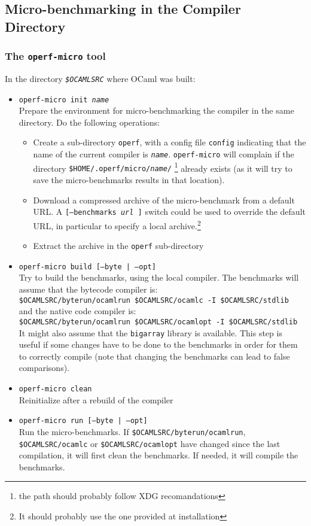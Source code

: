 \documentclass[11pt,a4paper]{article}
\begin{document}
\subsection{Micro-benchmarking in the Compiler Directory}

\subsubsection{The {\tt operf-micro} tool}

In the directory {\tt\em \$OCAMLSRC} where OCaml was built:
\begin{itemize}
\item {\tt operf-micro init {\em name}}\\ Prepare the environment
  for micro-benchmarking the compiler in the same directory.
  Do the following operations:
  \begin{itemize}
  \item Create a sub-directory {\tt operf}, with a config file {\tt config}
  indicating that the name of the current compiler is {\tt\em name}.
  {\tt operf-micro} will complain if the directory
  {\tt \$HOME/.operf/micro/{\em name}/} \footnote{the path should probably
    follow XDG recomandations} already exists (as it will try to
  save the micro-benchmarks results in that location).
  \item Download a compressed archive of the micro-benchmark from a
    default URL. A {\tt [--benchmarks {\em url} ]} switch could be
    used to override the default URL, in particular to specify a local
    archive.\footnote{It should probably use the one provided at
      installation}
  \item Extract the archive in the {\tt operf} sub-directory
  \end{itemize}
\item {\tt operf-micro build [--byte | --opt]}\\
  Try to build the benchmarks, using the local compiler. The benchmarks will
  assume that the bytecode compiler is:\\
  {\tt \$OCAMLSRC/byterun/ocamlrun \$OCAMLSRC/ocamlc -I \$OCAMLSRC/stdlib}\\
  and the native code compiler is:\\
  {\tt \$OCAMLSRC/byterun/ocamlrun \$OCAMLSRC/ocamlopt -I \$OCAMLSRC/stdlib}\\
  It might also assume that the {\tt bigarray} library is available.
  This step is useful if some changes have to be done to the benchmarks in
  order for them to correctly compile (note that changing the benchmarks
  can lead to false comparisons).
\item {\tt operf-micro clean}\\
  Reinitialize after a rebuild of the compiler
\item {\tt operf-micro run [--byte | --opt]}\\
  Run the micro-benchmarks. If {\tt \$OCAMLSRC/byterun/ocamlrun},
  {\tt \$OCAMLSRC/ocamlc} or {\tt \$OCAMLSRC/ocamlopt} have changed since the
  last compilation, it will first clean the benchmarks. If needed, it will
  compile the benchmarks.


\end{itemize}
\end{document}
